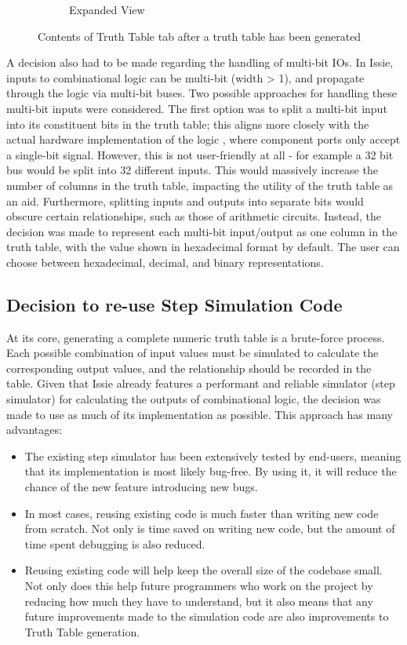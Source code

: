 \begin{figure}[h]
\begin{subfigure}[b]{0.48\textwidth}
         \caption{Expanded View}
         \label{fig:expand}
     \end{subfigure}
        \caption{Contents of Truth Table tab after a truth table has been generated}
        \label{fig:tttab}
\end{figure}

A decision also had to be made regarding the handling of multi-bit IOs.
In Issie, inputs to combinational logic can be multi-bit (width > 1), and propagate through the logic via multi-bit buses. Two possible approaches for handling these multi-bit inputs were considered. The first option was to split a multi-bit input into its constituent bits in the truth table; this aligns more closely with the actual hardware implementation of the logic \cite{muxtables}, where component ports only accept a single-bit signal. However, this is not user-friendly at all - for example a 32 bit bus would be split into 32 different inputs. This would massively increase the number of columns in the truth table, impacting the utility of the truth table as an aid. Furthermore, splitting inputs and outputs into separate bits would obscure certain relationships, such as those of arithmetic circuits. Instead, the decision was made to represent each multi-bit input/output as one column in the truth table, with the value shown in hexadecimal format by default. The user can choose between hexadecimal, decimal, and binary representations.

\subsection{Decision to re-use Step Simulation Code}
At its core, generating a complete numeric truth table is a brute-force process. Each possible combination of input values must be simulated to calculate the corresponding output values, and the relationship should be recorded in the table. 
Given that Issie already features a performant and reliable simulator (step simulator) for calculating the outputs of combinational logic, the decision was made to use as much of its implementation as possible. This approach has many advantages:
\begin{itemize}
    \item The existing step simulator has been extensively tested by end-users, meaning that its implementation is most likely bug-free. By using it, it will reduce the chance of the new feature introducing new bugs.
    \item In most cases, reusing existing code is much faster than writing new code from scratch. Not only is time saved on writing new code, but the amount of time spent debugging is also reduced.
    \item Reusing existing code will help keep the overall size of the codebase small. Not only does this help future programmers who work on the project by reducing how much they have to understand, but it also means that any future improvements made to the simulation code are also improvements to Truth Table generation.
\end{itemize}

